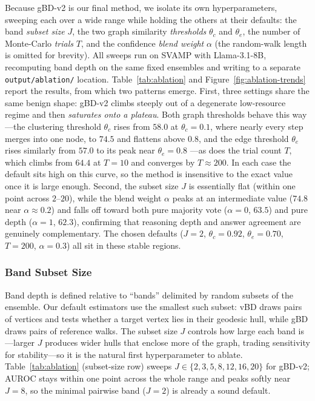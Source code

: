 \documentclass[11pt]{article}
\begin{document}
Because gBD-v2 is our final method, we isolate its own hyperparameters, sweeping
each over a wide range while holding the others at their defaults: the band
\emph{subset size} $J$, the two graph similarity \emph{thresholds} $\theta_c$ and
$\theta_e$, the number of Monte-Carlo \emph{trials} $T$, and the confidence
\emph{blend weight} $\alpha$ (the random-walk length is omitted for brevity). All
sweeps run on SVAMP with Llama-3.1-8B, recomputing band depth on the same fixed
ensembles and writing to a separate \texttt{output/ablation/} location.
Table~\ref{tab:ablation} and Figure~\ref{fig:ablation-trends} report the results,
from which two patterns emerge. First, three settings share the same benign shape:
gBD-v2 climbs steeply out of a degenerate low-resource regime and then
\emph{saturates onto a plateau}. Both graph thresholds behave this way---the
clustering threshold $\theta_c$ rises from $58.0$ at $\theta_c{=}0.1$, where nearly
every step merges into one node, to $74.5$ and flattens above $0.8$, and the edge
threshold $\theta_e$ rises similarly from $57.0$ to its peak near $\theta_e{=}0.8$
---as does the trial count $T$, which climbs from $64.4$ at $T{=}10$ and converges
by $T{\approx}200$. In each case the default sits high on this curve, so the method
is insensitive to the exact value once it is large enough. Second, the subset size
$J$ is essentially flat (within one point across $2$--$20$), while the blend weight
$\alpha$ peaks at an intermediate value ($74.8$ near $\alpha{\approx}0.2$) and falls
off toward both pure majority vote ($\alpha{=}0$, $63.5$) and pure depth
($\alpha{=}1$, $62.3$), confirming that reasoning depth and answer agreement are
genuinely complementary. The chosen defaults ($J{=}2$, $\theta_c{=}0.92$,
$\theta_e{=}0.70$, $T{=}200$, $\alpha{=}0.3$) all sit in these stable regions.

\subsubsection{Band Subset Size}
\label{sec:exp:ablation:subset}

Band depth is defined relative to ``bands'' delimited by random subsets of the
ensemble. Our default estimators use the smallest such subset: vBD draws pairs of
vertices and tests whether a target vertex lies in their geodesic hull, while gBD
draws pairs of reference walks. The subset size $J$ controls how large each band
is---larger $J$ produces wider hulls that enclose more of the graph, trading
sensitivity for stability---so it is the natural first hyperparameter to ablate.
Table~\ref{tab:ablation} (subset-size row) sweeps $J \in \{2,3,5,8,12,16,20\}$ for
gBD-v2; AUROC stays within one point across the whole range and peaks softly near
$J{=}8$, so the minimal pairwise band ($J{=}2$) is already a sound default.
\end{document}
